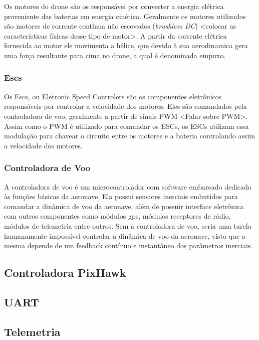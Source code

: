 \documentclass[12pt,a4paper,oneside]{book}
\begin{document}
Os motores do drone são os responsávei por converter a energia elétrica proveniente das baterias em energia cinética. Geralmente os 
motores utilizados são motores de corrente contínua não escovados (\textit{brushless DC}) <colocar as características físicas desse tipo de motor>.
A partir da corrente elétrica fornecida ao motor ele movimenta a hélice, que devido à sua aerodinamica gera uma força resultante para cima no drone,
a qual é denominada empuxo. 

\subsubsection*{Escs}

Os Escs, ou Eletronic Speed Controlers são os componentes eletrônicos responsáveis por controlar a velocidade dos motores.
Eles são comandados pela controladora de voo, geralmente a partir de sinais PWM <Falar sobre PWM>. Assim como o PWM é utilizado para comandar 
os ESCs, os ESCs utilizam essa modulação para chavear o circuito entre os motores e a bateria controlando assim a velocidade dos motores. 

\subsubsection*{Controladora de Voo}

A controladora de voo é um microcontrolador com software embarcado dedicado às funções básicas da aeronave. Ela possui sensores 
inerciais embutidos para comandar a dinâmica de voo da aeronave, além de possuir interface eletrônica com outros componentes como módulos gps, módulos receptores de rádio, módulos de telemetria entre outros. Sem a controladora de voo, seria uma tarefa humanamente impossível controlar a dinâmica de voo da aeronave, visto que a mesma depende de um feedback contínuo e instantâneo dos parâmetros inerciais. 


\subsection{Controladora PixHawk}



\subsection{UART}

\subsection{Telemetria}
\end{document}
